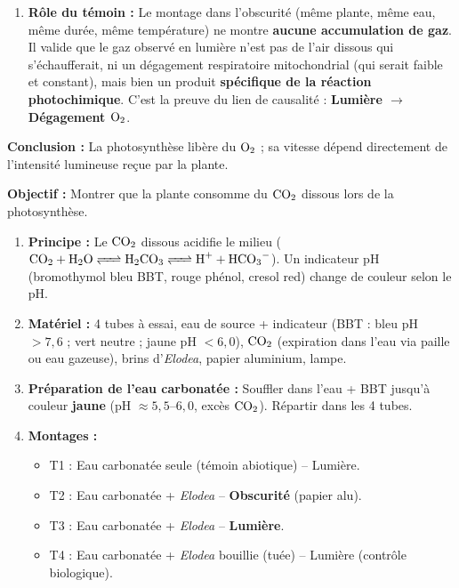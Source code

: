 \documentclass[11pt]{article}
\begin{document}
\begin{exoresolu}
\begin{enumerate}
        \item \textbf{Rôle du témoin :} Le montage dans l'obscurité (même plante, même eau, même durée, même température) ne montre \textbf{aucune accumulation de gaz}. Il valide que le gaz observé en lumière n'est pas de l'air dissous qui s'échaufferait, ni un dégagement respiratoire mitochondrial (qui serait faible et constant), mais bien un produit \textbf{spécifique de la réaction photochimique}. C'est la preuve du lien de causalité : \textbf{Lumière $\rightarrow$ Dégagement $\ce{O2}$}.
    \end{enumerate}
    \textbf{Conclusion :} La photosynthèse libère du $\ce{O2}$ ; sa vitesse dépend directement de l'intensité lumineuse reçue par la plante.
\end{exoresolu}

\begin{methode}
    \textbf{Objectif :} Montrer que la plante consomme du $\ce{CO2}$ dissous lors de la photosynthèse.
    \begin{enumerate}
        \item \textbf{Principe :} Le $\ce{CO2}$ dissous acidifie le milieu ($\ce{CO2 + H2O <=> H2CO3 <=> H+ + HCO3-}$). Un indicateur pH (bromothymol bleu BBT, rouge phénol, cresol red) change de couleur selon le pH.
        \item \textbf{Matériel :} 4 tubes à essai, eau de source + indicateur (BBT : bleu pH $> 7,6$ ; vert neutre ; jaune pH $< 6,0$), $\ce{CO2}$ (expiration dans l'eau via paille ou eau gazeuse), brins d'\emph{Elodea}, papier aluminium, lampe.
        \item \textbf{Préparation de l'eau carbonatée :} Souffler dans l'eau + BBT jusqu'à couleur \textbf{jaune} (pH $\approx 5,5$--$6,0$, excès $\ce{CO2}$). Répartir dans les 4 tubes.
        \item \textbf{Montages :}
            \begin{itemize}
                \item T1 : Eau carbonatée seule (témoin abiotique) -- Lumière.
                \item T2 : Eau carbonatée + \emph{Elodea} -- \textbf{Obscurité} (papier alu).
                \item T3 : Eau carbonatée + \emph{Elodea} -- \textbf{Lumière}.
                \item T4 : Eau carbonatée + \emph{Elodea} bouillie (tuée) -- Lumière (contrôle biologique).
            \end{itemize}

\end{enumerate}
\end{methode}
\end{document}
